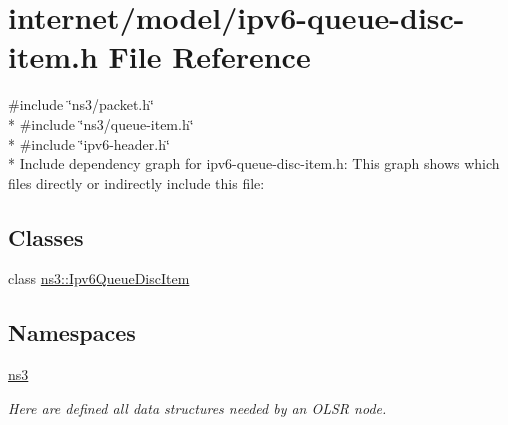 \hypertarget{ipv6-queue-disc-item_8h}{}\section{internet/model/ipv6-\/queue-\/disc-\/item.h File Reference}
\label{ipv6-queue-disc-item_8h}
{\ttfamily \#include \char`\"{}ns3/packet.\+h\char`\"{}}\\*
{\ttfamily \#include \char`\"{}ns3/queue-\/item.\+h\char`\"{}}\\*
{\ttfamily \#include \char`\"{}ipv6-\/header.\+h\char`\"{}}\\*
Include dependency graph for ipv6-\/queue-\/disc-\/item.h\+:
This graph shows which files directly or indirectly include this file\+:
\subsection*{Classes}
\begin{DoxyCompactItemize}
\item 
class \hyperlink{classns3_1_1Ipv6QueueDiscItem}{ns3\+::\+Ipv6\+Queue\+Disc\+Item}
\end{DoxyCompactItemize}
\subsection*{Namespaces}
\begin{DoxyCompactItemize}
\item 
 \hyperlink{namespacens3}{ns3}
\begin{DoxyCompactList}\small\item\em Here are defined all data structures needed by an O\+L\+SR node. \end{DoxyCompactList}\end{DoxyCompactItemize}

